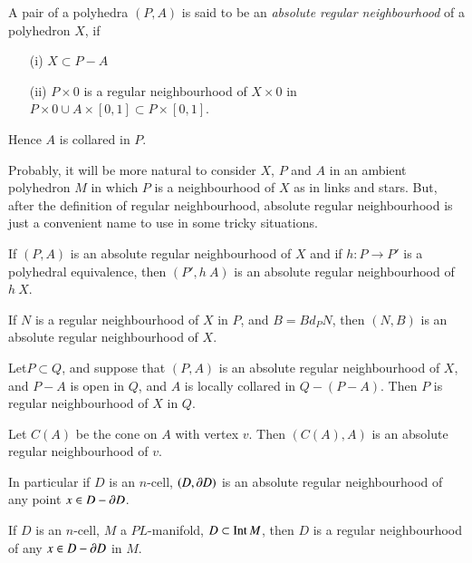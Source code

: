 \begin{definition}\label{chap6-defi6.5.1}
A pair of a polyhedra $(P,A)$ is said to be an {\em absolute regular neighbourhood} of a polyhedron $X$, if
\begin{itemize}
\item[(i)] $X\subset P-A$

\item[(ii)] $P\times 0$ is a regular neighbourhood of $X\times 0$ in $P\times 0\cup A\times[0,1]\subset P\times[0,1]$.
\end{itemize}

Hence $A$ is collared in $P$.
\end{definition}

Probably, it will be more natural to consider $X$, $P$ and $A$ in an ambient polyhedron $M$ in which $P$ is a neighbourhood of $X$ as in links and stars. But, after the definition of regular neighbourhood, absolute regular neighbourhood is just a convenient name to use in some tricky situations.

\begin{ex}\label{chap6-ex6.5.2}
If $(P,A)$ is an absolute regular neighbourhood of $X$ and if $h:P\to P'$ is a polyhedral equivalence, then $(P',h\ A)$ is an absolute regular neighbourhood of $h\ X$.
\end{ex}

\begin{ex}\label{chap6-ex6.5.3}
If $N$ is a regular neighbourhood of $X$ in $P$, and $B=Bd_{P}N$, then $(N,B)$ is an absolute regular neighbourhood of $X$.
\end{ex}

\begin{ex}\label{chap6-ex6.5.4}
Let\pageoriginale $P\subset Q$, and suppose that $(P,A)$ is an absolute regular neighbourhood of $X$, and $P-A$ is open in $Q$, and $A$ is locally collared in $Q-(P-A)$. Then $P$ is regular neighbourhood of $X$ in $Q$.
\end{ex}

\begin{ex}\label{chap6-ex6.5.5}
Let $C(A)$ be the cone on $A$ with vertex $v$. Then $(C(A),A)$ is an absolute regular neighbourhood of $v$.
\end{ex}

In particular if $D$ is an $n$-cell, $(D,\partial D)$ is an absolute regular neighbourhood of any point $x\in D-\partial D$.

\begin{theorem}\label{chap6-thm6.5.6}
If $D$ is an $n$-cell, $M$ a $PL$-manifold, $D\subset\operatorname{Int} M$, then $D$ is a regular neighbourhood of any $x\in D-\partial D$ in $M$.
\end{theorem}

